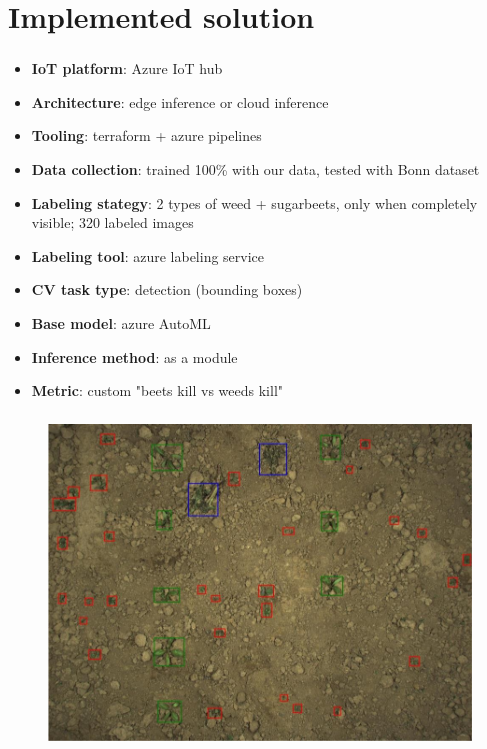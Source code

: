 \documentclass{beamer}
\makeatletter
\newcommand*{\currentname}{\@currentlabelname}
\makeatother
\begin{document}
\section{Implemented solution}
\begin{frame}
\centering \Huge {\currentname}
\end{frame}

\begin{frame}
\frametitle{\secname}
\begin{itemize}
\item \textbf{IoT platform}: Azure IoT hub
\item \textbf{Architecture}: edge inference or cloud inference
\item \textbf{Tooling}: terraform + azure pipelines
\item \textbf{Data collection}: trained 100\% with our data, tested with Bonn dataset
\item \textbf{Labeling stategy}: 2 types of weed + sugarbeets, only when completely visible; 320 labeled images
\item \textbf{Labeling tool}: azure labeling service
\item \textbf{CV task type}: detection (bounding boxes)
\item \textbf{Base model}: azure AutoML
\item \textbf{Inference method}: as a module 
\item \textbf{Metric}: custom "beets kill vs weeds kill" 
\end{itemize}
\end{frame}

\begin{frame}
\frametitle{\currentname}
\begin{figure}
\includegraphics[width=0.9\linewidth]{Imagens/prediction.png}
\end{figure}
\end{frame}
\end{document}
